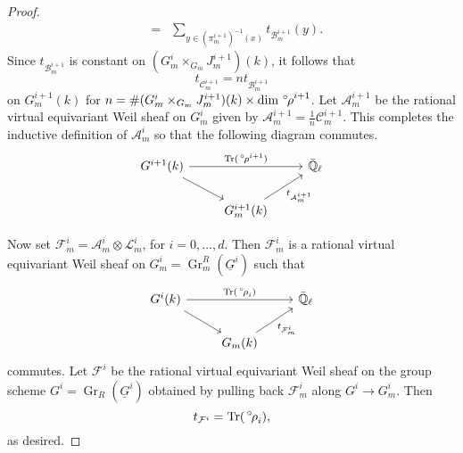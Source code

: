 \documentclass[10pt]{amsart}
\theoremstyle{plain}
\theoremstyle{definition}
\newcommand{\EE}{\mathbb{\bar Q}_\ell}
\newcommand{\Fq}{k}
\DeclareMathOperator{\Gr}{Gr}
\DeclareMathOperator{\trace}{Tr}
\newcommand{\trFrob}[1]{t_{#1}}
\newcommand{\cs}[1]{{\mathcal{#1}}}
\newcommand{\orho}{{\,^\circ \hskip-1pt \rho}}
\begin{document}
\begin{proof}
\begin{eqnarray*}
&=& \sum_{y\in (\pi_m^{i+1})^{-1}(x)}  \trFrob{\cs{B}_m^{i+1}}(y).
\end{eqnarray*}
Since $\trFrob{\cs{B}^{i+1}_m}$ is constant on $(G_m^{i}\times_{G_m} J_m^{i+1})(\Fq)$, it follows that 
\[
\trFrob{\cs{C}^{i+1}_m} = n \trFrob{\cs{B}^{i+1}_m}
\]
on $G_m^{i+1}(\Fq)$ for $n = \# (G_m^{i}\times_{G_m} J_m^{i+1})(\Fq) \times \dim \orho^{i+1} $.
Let $\cs{A}_m^{i+1}$ be the rational virtual equivariant Weil sheaf on $G_m^i$ given by $\cs{A}_m^{i+1} = \frac{1}{n} \cs{C}_m^{i+1}$. 
%
This completes the inductive definition of $\cs{A}_m^i$ so that the following diagram commutes.
\[
\begin{tikzcd}
G^{i+1}(\Fq) \arrow{rr}{\trace(\orho^{i+1})} \arrow{rd} && \EE\\
& G_m^{i+1}(\Fq)\arrow{ru}[swap]{{\trFrob{\cs{A}_m^{i+1}}} } & 
\end{tikzcd}
\]

Now set $\cs{F}^i_m = \cs{A}_m^{i} \otimes \cs{L}_m^i$, for $i=0, \ldots ,d$.
Then $\cs{F}^i_m$ is a rational virtual equivariant Weil sheaf on $G^i_m = \Gr^{R}_m(\underline{G}^i)$ such that
\[
\begin{tikzcd}
G^i(\Fq) \arrow{rr}{\trace(\orho_i)} \arrow{rd} && \EE\\
& G_m(\Fq) \arrow{ru}[swap]{\trFrob{\cs{F}^i_m}} & 
\end{tikzcd}
\]
commutes.
Let $\cs{F}^i$ be the rational virtual equivariant Weil sheaf on the group scheme $G^i= \Gr_{R}(\underline{G}^i)$ obtained by pulling back $\cs{F}_m^i$ along $G^i \to G^i_m$.
Then 
\[
\trFrob{\cs{F}^i} = \trace(\orho_i),
\] 
as desired.
\end{proof}


\bigskip
\end{document}

